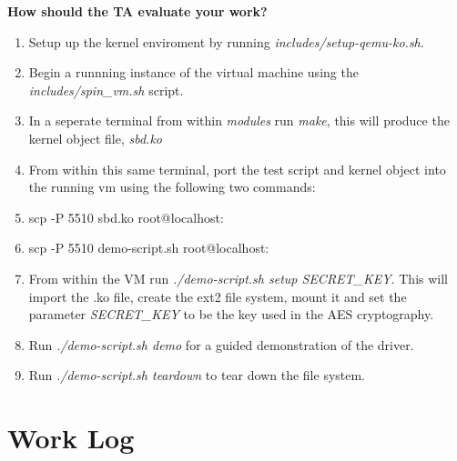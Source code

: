 \documentclass[10pt,onecolumn,draftclsnofoot]{IEEEtran} %
\begin{document}
\begin{singlespace}
        \textbf{How should the TA evaluate your work?}\\
	\begin{enumerate}
		\item Setup up the kernel enviroment by running \textit{includes/setup-qemu-ko.sh}.
                \item Begin a runnning instance of the virtual machine using the \textit{includes/spin\_vm.sh} script.  
                \item In a seperate terminal from within \textit{modules} run \textit{make}, this will produce the kernel object file, \textit{sbd.ko}
                \item From within this same terminal, port the test script and kernel object into the running vm using the following two commands:
		\item scp -P 5510 sbd.ko root@localhost:~
		\item scp -P 5510 demo-script.sh root@localhost:~ 
		\item From within the VM run \textit{./demo-script.sh setup SECRET\_KEY}. This will import the .ko file, create the ext2 file system, mount it and set the parameter \textit{SECRET\_KEY} to be the key used in the AES cryptography. 
		\item Run \textit{./demo-script.sh demo} for a guided demonstration of the driver. 
		\item Run \textit{./demo-script.sh teardown} to tear down the file system. 
        \end{enumerate}

\section{\bf Work Log}

                

\newpage


\end{singlespace}
\restoregeometry
\end{document}
